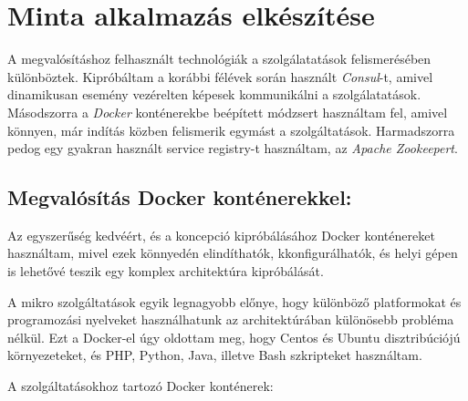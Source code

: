 \documentclass[11pt,magyar,a4paper,oneside,]{report}
\begin{document}
\chapter{Minta alkalmazás
elkészítése}\label{minta-alkalmazuxe1s-elkuxe9szuxedtuxe9se}

A megvalósításhoz felhasznált technológiák a szolgálatatások
felismerésében különböztek. Kipróbáltam a korábbi félévek során használt
\emph{Consul}-t, amivel dinamikusan esemény vezérelten képesek
kommunikálni a szolgálatatások. Másodszorra a \emph{Docker} konténerekbe
beépített módzsert használtam fel, amivel könnyen, már indítás közben
felismerik egymást a szolgáltatások. Harmadszorra pedog egy gyakran
használt service registry-t használtam, az \emph{Apache Zookeepert}.

\section{Megvalósítás Docker
konténerekkel:}\label{megvaluxf3suxedtuxe1s-docker-kontuxe9nerekkel}

Az egyszerűség kedvéért, és a koncepció kipróbálásához Docker
konténereket használtam, mivel ezek könnyedén elindíthatók,
kkonfigurálhatók, és helyi gépen is lehetővé teszik egy komplex
architektúra kipróbálását.

A mikro szolgáltatások egyik legnagyobb előnye, hogy különböző
platformokat és programozási nyelveket használhatunk az architektúrában
különösebb probléma nélkül. Ezt a Docker-el úgy oldottam meg, hogy
Centos és Ubuntu disztribúciójú környezeteket, és PHP, Python, Java,
illetve Bash szkripteket használtam.

A szolgáltatásokhoz tartozó Docker konténerek:
\end{document}
